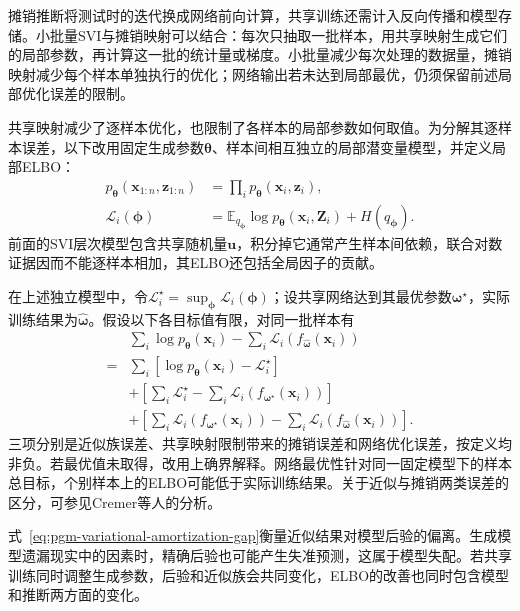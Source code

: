摊销推断将测试时的迭代换成网络前向计算，共享训练还需计入反向传播和模型存储。小批量SVI与摊销映射可以结合：每次只抽取一批样本，用共享映射生成它们的局部参数，再计算这一批的统计量或梯度。小批量减少每次处理的数据量，摊销映射减少每个样本单独执行的优化；网络输出若未达到局部最优，仍须保留前述局部优化误差的限制。

共享映射减少了逐样本优化，也限制了各样本的局部参数如何取值。为分解其逐样本误差，以下改用固定生成参数$\bm\theta$、样本间相互独立的局部潜变量模型，并定义局部ELBO：
\[
  \begin{aligned}
    p_{\bm\theta}(\bm x_{1:n},\bm z_{1:n})
      &=\prod_i p_{\bm\theta}(\bm x_i,\bm z_i),\\
    \mathcal L_i(\bm\phi)
      &=\mathbb E_{q_{\bm\phi}}
          \log p_{\bm\theta}(\bm x_i,\bm Z_i)+H(q_{\bm\phi}).
  \end{aligned}
\]
前面的SVI层次模型包含共享随机量$\bm u$，积分掉它通常产生样本间依赖，联合对数证据因而不能逐样本相加，其ELBO还包括全局因子的贡献。

在上述独立模型中，令$\mathcal L_i^\star=\sup_{\bm{\phi}}\mathcal L_i(\bm{\phi})$；设共享网络达到其最优参数$\bm{\omega}^\star$，实际训练结果为$\widehat{\bm{\omega}}$。假设以下各目标值有限，对同一批样本有
\begin{equation}
  \begin{aligned}
    &\sum_i\log p_{\bm\theta}(\bm x_i)
       -\sum_i\mathcal L_i(f_{\widehat{\bm{\omega}}}(\bm x_i))\\
    ={}&\sum_i[\log p_{\bm\theta}(\bm x_i)-\mathcal L_i^\star]\\
     &+\left[\sum_i\mathcal L_i^\star
          -\sum_i\mathcal L_i(f_{\bm{\omega}^\star}(\bm x_i))\right]\\
     &+\left[\sum_i\mathcal L_i(f_{\bm{\omega}^\star}(\bm x_i))
          -\sum_i\mathcal L_i(f_{\widehat{\bm{\omega}}}(\bm x_i))\right].
  \end{aligned}
  \label{eq:pgm-variational-amortization-gap}
\end{equation}
三项分别是近似族误差、共享映射限制带来的摊销误差和网络优化误差，按定义均非负。若最优值未取得，改用上确界解释。网络最优性针对同一固定模型下的样本总目标，个别样本上的ELBO可能低于实际训练结果。关于近似与摊销两类误差的区分，可参见Cremer等人的分析。

式~\eqref{eq:pgm-variational-amortization-gap}衡量近似结果对模型后验的偏离。生成模型遗漏现实中的因素时，精确后验也可能产生失准预测，这属于模型失配。若共享训练同时调整生成参数，后验和近似族会共同变化，ELBO的改善也同时包含模型和推断两方面的变化。

